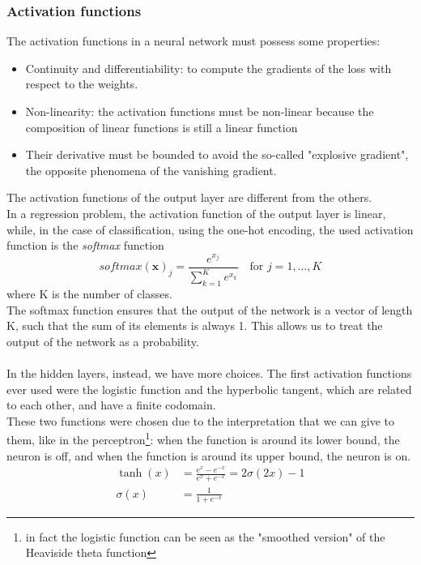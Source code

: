 \subsubsection*{Activation functions}
The activation functions in a neural network must possess some properties:
\begin{itemize}
    \item Continuity and differentiability: to compute the gradients of the loss with respect to the weights.
    \item Non-linearity: the activation functions must be non-linear because the composition of linear functions is still a linear function
    \item Their derivative must be bounded to avoid the so-called "explosive gradient", the opposite phenomena of the vanishing gradient.
\end{itemize}
The activation functions of the output layer are different from the others.\\
In a regression problem, the activation function of the output layer is linear, while, in the case of classification, using the one-hot encoding, the used activation function is the \textit{softmax} function
\begin{equation}
    {\textit{softmax} (\mathbf {x} )_{j}={\frac {e^{x_{j}}}{\sum _{k=1}^{K}e^{x_{k}}}}} \quad \text{for } j=1,\dots,K
\end{equation}
where K is the number of classes.\\
The softmax function ensures that the output of the network is a vector of length K, such that the sum of its elements is always 1. This allows us to treat the output of the network as a probability.\\
\\
In the hidden layers, instead, we have more choices. The first activation functions ever used were the logistic function and the hyperbolic tangent, which are related to each other, and have a finite codomain.\\
These two functions were chosen due to the interpretation that we can give to them, like in the perceptron\footnote{in fact the logistic function can be seen as the "smoothed version" of the Heaviside theta function}: when the function is around its lower bound, the neuron is off, and when the function is around its upper bound, the neuron is on.
\begin{align}
    \tanh(x)&= \frac{e^x-e^{-x}}{e^x+e^{-x}}=2\sigma(2x)-1  \\
    \sigma(x)&=\frac{1}{1+e^{-x}} 
\end{align}
